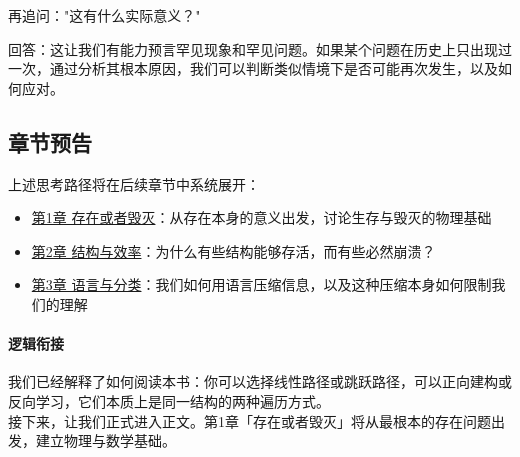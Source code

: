 \documentclass[../main.tex]{subfiles}
\begin{document}
再追问："这有什么实际意义？"

回答：这让我们有能力预言罕见现象和罕见问题。如果某个问题在历史上只出现过一次，通过分析其根本原因，我们可以判断类似情境下是否可能再次发生，以及如何应对。


	\subsection{章节预告}

上述思考路径将在后续章节中系统展开：
\begin{itemize}
	\item \hyperref[ch:existence]{第1章 存在或者毁灭}：从存在本身的意义出发，讨论生存与毁灭的物理基础
	\item \hyperref[chap:structure_efficiency]{第2章 结构与效率}：为什么有些结构能够存活，而有些必然崩溃？
	\item \hyperref[ch:language]{第3章 语言与分类}：我们如何用语言压缩信息，以及这种压缩本身如何限制我们的理解
\end{itemize}

	\paragraph*{逻辑衔接}
	我们已经解释了如何阅读本书：你可以选择线性路径或跳跃路径，可以正向建构或反向学习，它们本质上是同一结构的两种遍历方式。\\
	接下来，让我们正式进入正文。第1章「存在或者毁灭」将从最根本的存在问题出发，建立物理与数学基础。
\end{document}
